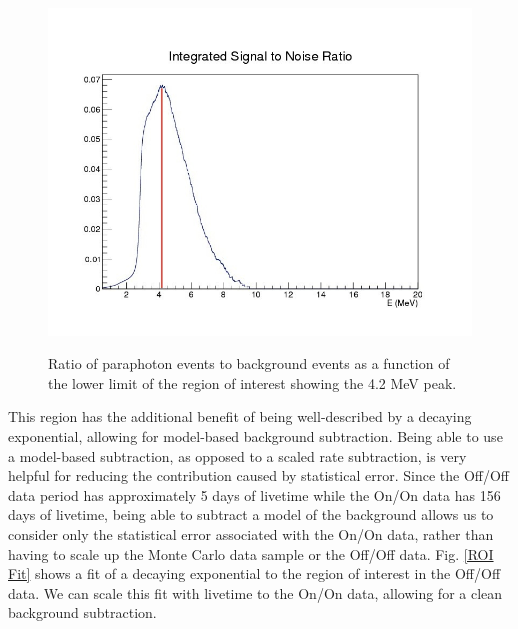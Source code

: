  \begin{figure}
\caption{Ratio of paraphoton events to background events as a function of the lower limit of the region of interest showing the 4.2 MeV peak.}
\includegraphics[width=\textwidth]{Paraphotons/Paraphoton_Signal_Noise_w_Cut.jpg}
\label{S/N}
\end{figure}

This region has the additional benefit of being well-described by a decaying exponential, allowing for model-based background subtraction. Being able to use a model-based subtraction, as opposed to a scaled rate subtraction, is very helpful for reducing the contribution caused by statistical error. Since the Off/Off data period has approximately 5 days of livetime while the On/On data has 156 days of livetime, being able to subtract a model of the background allows us to consider only the statistical error associated with the On/On  data, rather than having to scale up the Monte Carlo data sample or the Off/Off data. Fig. \ref{ROI Fit} shows a fit of a decaying exponential to the region of interest in the Off/Off data. We can scale this fit with livetime to the On/On data, allowing for a clean background subtraction.

